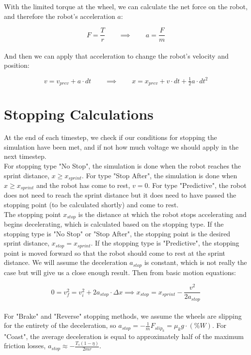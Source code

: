 \documentclass[a4paper]{article}
\begin{document}
	With the limited torque at the wheel, we can calculate the net force on the robot, and therefore the robot's acceleration $ a $:
	
	\begin{equation}
		F = \frac{T}{r} \qquad\implies\qquad a = \frac{F}{m}
	\end{equation}
	\\
	And then we can apply that acceleration to change the robot's velocity and position:
	
	\begin{equation}
		v = v_{prev} + a \cdot dt \qquad\implies\qquad x = x_{prev} + v \cdot dt + \tfrac{1}{2} a \cdot dt^2
	\end{equation}
	
	
	\section*{Stopping Calculations}
	
	At the end of each timestep, we check if our conditions for stopping the simulation have been met, and if not how much voltage we should apply in the next timestep.\\
	
	For stopping type "No Stop", the simulation is done when the robot reaches the sprint distance, $ x \geq x_{sprint} $. For type "Stop After", the simulation is done when $ x \geq x_{sprint} $ and the robot has come to rest, $ v = 0 $. For type "Predictive", the robot does not need to reach the sprint distance but it does need to have passed the stopping point (to be calculated shortly) and come to rest.\\
	
	The stopping point $ x_{stop} $ is the distance at which the robot stops accelerating and begins decelerating, which is calculated based on the stopping type. If the stopping type is "No Stop" or "Stop After", the stopping point is the desired sprint distance, $ x_{stop} = x_{sprint} $. If the stopping type is "Predictive", the stopping point is moved forward so that the robot should come to rest at the sprint distance. We will assume the deceleration $ a_{stop} $ is constant, which is not really the case but will give us a close enough result. Then from basic motion equations:
	
	\begin{equation}
		0 = v_f^2 = v_i^2 + 2a_{stop} \cdot \Delta x \implies x_{stop} = x_{sprint} - \frac{v^2}{2a_{stop}}
	\end{equation}
	\\
	For "Brake" and "Reverse" stopping methods, we assume the wheels are slipping for the entirety of the deceleration, so $ a_{stop} = - \frac{1}{m} F_{slip_k} = \mu_k g \cdot \left( \% W \right) $. For "Coast", the average deceleration is equal to approximately half of the maximum friction losses, $ a_{stop} \approx -\frac{T_s \left( 1-\eta \right)}{2 m r} $.\\
	
\end{document}
